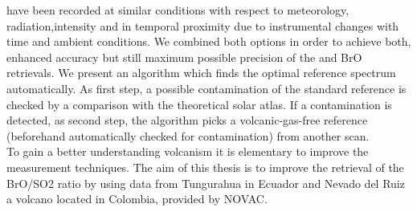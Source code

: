 have been recorded at similar conditions with respect to meteorology,
radiation,intensity and in temporal proximity due to instrumental changes
with time and ambient conditions. We combined both options in order to
achieve both, enhanced accuracy but still maximum possible precision of
the  and BrO retrievals. We present an algorithm which finds the
optimal reference spectrum automatically. As first step, a possible 
contamination of the standard reference is checked by a comparison with
the theoretical solar atlas. If a contamination is detected, as second step,
the algorithm picks a volcanic-gas-free reference (beforehand
automatically checked for contamination) from another scan.\\
%
\newline
%
To gain a better understanding volcanism it is elementary to improve the measurement techniques. The aim of this thesis is to improve the retrieval of the BrO/SO2 ratio by using data from Tungurahua in Ecuador and Nevado del Ruiz a volcano located in Colombia, provided by NOVAC.



















